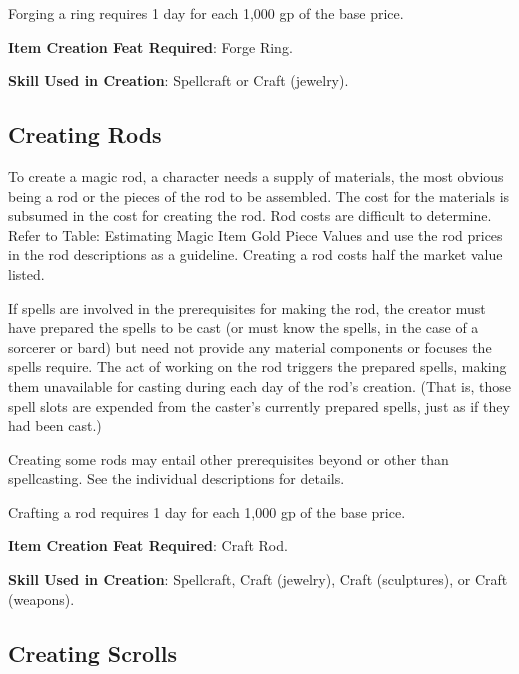 Forging a ring requires 1 day for each 1,000 gp of the base price.
				
\textbf{Item Creation Feat Required}: Forge Ring.
				
\textbf{Skill Used in Creation}: Spellcraft or Craft (jewelry).
				
\subsection{Creating Rods}

				
To create a magic rod, a character needs a supply of materials, the most obvious being a rod or the pieces of the rod to be assembled. The cost for the materials is subsumed in the cost for creating the rod. Rod costs are difficult to determine. Refer to Table: Estimating Magic Item Gold Piece Values and use the rod prices in the rod descriptions as a guideline. Creating a rod costs half the market value listed.
				
If spells are involved in the prerequisites for making the rod, the creator must have prepared the spells to be cast (or must know the spells, in the case of a sorcerer or bard) but need not provide any material components or focuses the spells require. The act of working on the rod triggers the prepared spells, making them unavailable for casting during each day of the rod's creation. (That is, those spell slots are expended from the caster's currently prepared spells, just as if they had been cast.)
				
Creating some rods may entail other prerequisites beyond or other than spellcasting. See the individual descriptions for details.
				
Crafting a rod requires 1 day for each 1,000 gp of the base price.
				
\textbf{Item Creation Feat Required}: Craft Rod.
				
\textbf{Skill Used in Creation}: Spellcraft, Craft (jewelry), Craft (sculptures), or Craft (weapons).
				
\subsection{Creating Scrolls}


